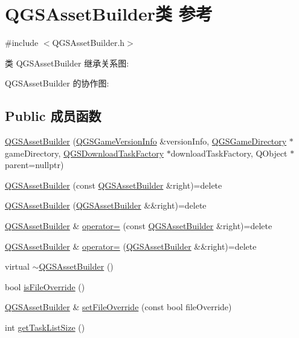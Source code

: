 \hypertarget{class_q_g_s_asset_builder}{}\section{Q\+G\+S\+Asset\+Builder类 参考}
\label{class_q_g_s_asset_builder}


{\ttfamily \#include $<$Q\+G\+S\+Asset\+Builder.\+h$>$}



类 Q\+G\+S\+Asset\+Builder 继承关系图\+:


Q\+G\+S\+Asset\+Builder 的协作图\+:
\subsection*{Public 成员函数}
\begin{DoxyCompactItemize}
\item 
\mbox{\hyperlink{class_q_g_s_asset_builder_a3377a93cb77f7181d6e4644f49f2ce56}{Q\+G\+S\+Asset\+Builder}} (\mbox{\hyperlink{class_q_g_s_game_version_info}{Q\+G\+S\+Game\+Version\+Info}} \&version\+Info, \mbox{\hyperlink{class_q_g_s_game_directory}{Q\+G\+S\+Game\+Directory}} $\ast$game\+Directory, \mbox{\hyperlink{class_q_g_s_download_task_factory}{Q\+G\+S\+Download\+Task\+Factory}} $\ast$download\+Task\+Factory, Q\+Object $\ast$parent=nullptr)
\item 
\mbox{\hyperlink{class_q_g_s_asset_builder_acfd4824607044d785d5b8b2f5e7189ed}{Q\+G\+S\+Asset\+Builder}} (const \mbox{\hyperlink{class_q_g_s_asset_builder}{Q\+G\+S\+Asset\+Builder}} \&right)=delete
\item 
\mbox{\hyperlink{class_q_g_s_asset_builder_a77fc891c54c327a3305ea12272aad6d9}{Q\+G\+S\+Asset\+Builder}} (\mbox{\hyperlink{class_q_g_s_asset_builder}{Q\+G\+S\+Asset\+Builder}} \&\&right)=delete
\item 
\mbox{\hyperlink{class_q_g_s_asset_builder}{Q\+G\+S\+Asset\+Builder}} \& \mbox{\hyperlink{class_q_g_s_asset_builder_acc2087600e11b0053cff7aa63a7ec3df}{operator=}} (const \mbox{\hyperlink{class_q_g_s_asset_builder}{Q\+G\+S\+Asset\+Builder}} \&right)=delete
\item 
\mbox{\hyperlink{class_q_g_s_asset_builder}{Q\+G\+S\+Asset\+Builder}} \& \mbox{\hyperlink{class_q_g_s_asset_builder_a502f465d07a71127012067a6908e9819}{operator=}} (\mbox{\hyperlink{class_q_g_s_asset_builder}{Q\+G\+S\+Asset\+Builder}} \&\&right)=delete
\item 
virtual \mbox{\hyperlink{class_q_g_s_asset_builder_a76c6b4ddb05087740ca531aa7399f782}{$\sim$\+Q\+G\+S\+Asset\+Builder}} ()
\item 
bool \mbox{\hyperlink{class_q_g_s_asset_builder_aff3fd90286ef3ae16850e70f9de84678}{is\+File\+Override}} ()
\item 
\mbox{\hyperlink{class_q_g_s_asset_builder}{Q\+G\+S\+Asset\+Builder}} \& \mbox{\hyperlink{class_q_g_s_asset_builder_ac843e57909bd103a955e68f7df85e63c}{set\+File\+Override}} (const bool file\+Override)
\item 
int \mbox{\hyperlink{class_q_g_s_asset_builder_a028700ba95d1e23858986ccdca7b7237}{get\+Task\+List\+Size}} ()
\end{DoxyCompactItemize}
